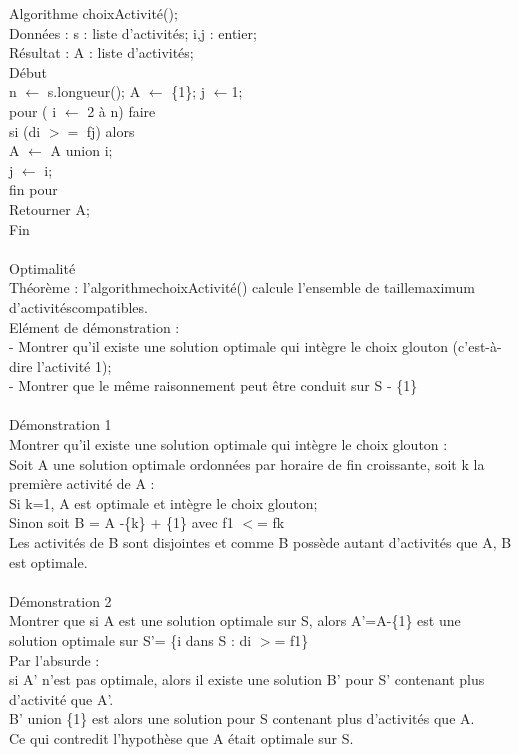 \documentclass[5pt]{article}
\newcommand\tab[1][1cm]{\hspace*{#1}}
\begin{document}
\begin{scriptsize}
Algorithme choixActivité();\\
Données : s : liste d’activités; i,j : entier;\\
Résultat : A : liste d’activités;\\
Début\\
n $\leftarrow$ s.longueur(); A $\leftarrow$ \{1\};  j $\leftarrow$1;\\
pour ( i $\leftarrow$ 2 à n) faire \\
\tab si (di $>=$ fj)  alors \\
\tab\tab A $\leftarrow$ A union i;\\
\tab\tab j $\leftarrow$ i;\\
fin pour\\
Retourner A;\\
Fin\\
\\
Optimalité\\
Théorème : l’algorithmechoixActivité() calcule l’ensemble de taillemaximum d’activitéscompatibles.\\
Elément de démonstration :\\
- Montrer qu’il existe une solution optimale qui intègre le choix glouton (c’est-à-dire l’activité 1);\\
- Montrer que le même raisonnement peut être conduit sur S - \{1\}\\
\\
Démonstration 1\\
Montrer qu’il existe une solution optimale qui intègre le choix glouton :\\ 
Soit A une solution optimale ordonnées par horaire de fin croissante, soit k la première activité de A :\\
Si k=1, A est optimale et intègre le choix glouton;\\
Sinon soit B = A -\{k\} +  \{1\} avec f1 $<$= fk\\
Les activités de B sont disjointes et comme B possède autant d’activités que A, B est optimale.\\
\\
Démonstration 2\\
Montrer que si A est une solution optimale sur S, alors  A’=A-\{1\} est une solution optimale sur S’= \{i dans S : di $>$= f1\}\\
Par l’absurde :\\
si A’ n’est pas optimale, alors il existe une solution  B’ pour S’ contenant plus       d’activité que A’.\\
B’ union \{1\} est alors une solution pour S contenant plus d’activités que A.\\
Ce qui contredit l’hypothèse que A était optimale sur S.\\

\end{scriptsize}
\end{document}
